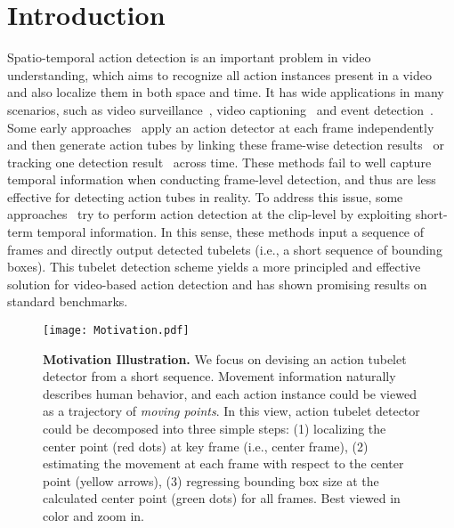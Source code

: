 \documentclass[runningheads]{llncs}
\begin{document}
\section{Introduction}\label{introduction}

Spatio-temporal action detection is an important problem in video understanding, which aims to recognize all action instances present in a video and also localize them in both space and time. It has wide applications in many scenarios, such as video surveillance~\cite{videoSurveillance2,videoSurveillance1}, video captioning~\cite{videoCaptioning1,videoCaptioning2} and event detection~\cite{gan2015devnet}. Some early approaches~\cite{gkioxari2015finding,peng2016multi,SahaSSTC16,Wang0TG16,weinzaepfel2015learning,singh2017online} apply an action detector at each frame independently and then generate action tubes by linking these frame-wise detection results~\cite{gkioxari2015finding,peng2016multi,SahaSSTC16,Wang0TG16,singh2017online} or tracking one detection result~\cite{weinzaepfel2015learning} across time. These methods fail to well capture temporal information when conducting frame-level detection, and thus are less effective for detecting action tubes in reality. To address this issue, some approaches~\cite{saha2017amtnet,kalogeiton2017action,hou2017tube,yang2019step,zhao2019dance,song2019tacnet} try to perform action detection at the clip-level by exploiting short-term temporal information. In this sense, these methods input a sequence of frames and directly output detected tubelets (i.e., a short sequence of bounding boxes). This tubelet detection scheme yields a more principled and effective solution for video-based action detection and has shown promising results on standard benchmarks.

\begin{figure}[t]
  \centering
    \texttt{[image: Motivation.pdf]}
    \caption{\textbf{Motivation Illustration.}
    We focus on devising an action tubelet detector from a short sequence. Movement information naturally describes human behavior, and each action instance could be viewed as a trajectory of {\em moving points}. In this view, action tubelet detector could be decomposed into three simple steps: (1) localizing the center point (red dots) at key frame (i.e., center frame), (2) estimating the movement at each frame with respect to the center point (yellow arrows), (3) regressing bounding box size at the calculated center point (green dots) for all frames.
    Best viewed in color and zoom in.
    }
    \label{fig:motivation}
  \end{figure}
\end{document}
